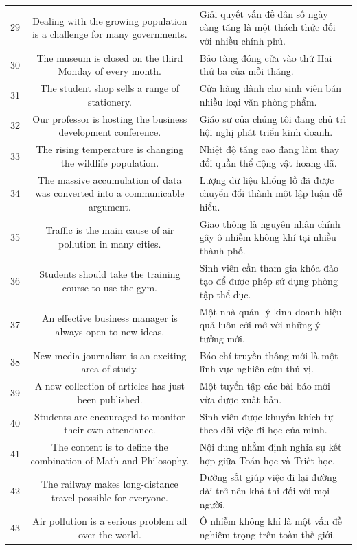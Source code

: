 \documentclass[11pt,a4paper]{article}
\begin{document}
\begin{longtable}{N S M}
29 & Dealing with the growing population is a challenge for many governments. & Giải quyết vấn đề dân số ngày càng tăng là một thách thức đối với nhiều chính phủ. \\
30 & The museum is closed on the third Monday of every month. & Bảo tàng đóng cửa vào thứ Hai thứ ba của mỗi tháng. \\
31 & The student shop sells a range of stationery. & Cửa hàng dành cho sinh viên bán nhiều loại văn phòng phẩm. \\
32 & Our professor is hosting the business development conference. & Giáo sư của chúng tôi đang chủ trì hội nghị phát triển kinh doanh. \\
33 & The rising temperature is changing the wildlife population. & Nhiệt độ tăng cao đang làm thay đổi quần thể động vật hoang dã. \\
34 & The massive accumulation of data was converted into a communicable argument. & Lượng dữ liệu khổng lồ đã được chuyển đổi thành một lập luận dễ hiểu. \\
35 & Traffic is the main cause of air pollution in many cities. & Giao thông là nguyên nhân chính gây ô nhiễm không khí tại nhiều thành phố. \\
36 & Students should take the training course to use the gym. & Sinh viên cần tham gia khóa đào tạo để được phép sử dụng phòng tập thể dục. \\
37 & An effective business manager is always open to new ideas. & Một nhà quản lý kinh doanh hiệu quả luôn cởi mở với những ý tưởng mới. \\
38 & New media journalism is an exciting area of study. & Báo chí truyền thông mới là một lĩnh vực nghiên cứu thú vị. \\
39 & A new collection of articles has just been published. & Một tuyển tập các bài báo mới vừa được xuất bản. \\
40 & Students are encouraged to monitor their own attendance. & Sinh viên được khuyến khích tự theo dõi việc đi học của mình. \\
41 & The content is to define the combination of Math and Philosophy. & Nội dung nhằm định nghĩa sự kết hợp giữa Toán học và Triết học. \\
42 & The railway makes long-distance travel possible for everyone. & Đường sắt giúp việc đi lại đường dài trở nên khả thi đối với mọi người. \\
43 & Air pollution is a serious problem all over the world. & Ô nhiễm không khí là một vấn đề nghiêm trọng trên toàn thế giới. \\

\end{longtable}
\end{document}
